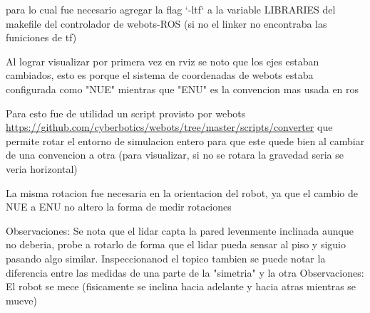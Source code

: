 para lo cual fue necesario agregar la flag `-ltf` a la variable LIBRARIES del makefile del controlador de webots-ROS (si no el linker no encontraba las funiciones de tf)

Al lograr visualizar por primera vez en rviz se noto que los ejes estaban cambiados, esto es porque el sistema de coordenadas de webots estaba configurada como "NUE" mientras que "ENU" es la convencion mas usada en ros

Para esto fue de utilidad un script provisto por webots \url{https://github.com/cyberbotics/webots/tree/master/scripts/converter} que permite rotar el entorno de simulacion entero para que este quede bien al cambiar de una convencion a otra (para visualizar, si no se rotara la gravedad seria se veria horizontal)

La misma rotacion fue necesaria en la orientacion del robot, ya que el cambio de NUE a ENU no altero la forma de medir rotaciones

Observaciones: Se nota que el lidar capta la pared levenmente inclinada aunque no deberia, probe a rotarlo de forma que el lidar pueda sensar al piso y siguio pasando algo similar. Inspeccionanod el topico tambien se puede notar la diferencia entre las medidas de una parte de la "simetria" y la otra
Observaciones: El robot se mece (fisicamente se inclina hacia adelante y hacia atras mientras se mueve)

